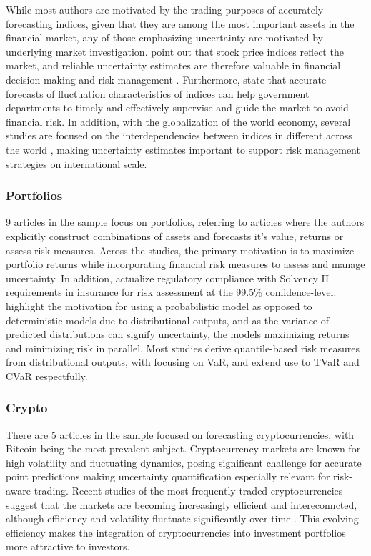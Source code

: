 While most authors are motivated by the trading purposes of accurately forecasting indices, given that they are among the most important assets in the financial market, any of those emphasizing uncertainty are motivated by underlying market investigation. \cite{Suphawan2022gpr} point out that stock price indices reflect the market, and reliable uncertainty estimates are therefore valuable in financial decision-making and risk management \parencite{Wang2021gpr}. Furthermore, \cite{Wang2021gprensemble} state that accurate forecasts of fluctuation characteristics of indices can help government departments to timely and effectively supervise and guide the market to avoid financial risk. In addition, with the globalization of the world economy, several studies are focused on the interdependencies between indices in different across the world \parencite{cao2019multi} \parencite{Malagrino2018Forecasting}, making uncertainty estimates important to support risk management strategies on international scale.

\subsubsection{Portfolios}
9 articles in the sample focus on portfolios, referring to articles where the authors explicitly construct combinations of assets and forecasts it's value, returns or assess risk measures. Across the studies, the primary motivation is to maximize portfolio returns while incorporating financial risk measures to assess and manage uncertainty. In addition, \cite{Risk2018gpr} actualize regulatory compliance with Solvency II requirements in insurance for risk assessment at the 99.5\% confidence-level. \cite{kim2023portfolio} highlight the motivation for using a probabilistic model as opposed to deterministic models due to distributional outputs, and as the variance of predicted distributions can signify uncertainty, the models maximizing returns and minimizing risk in parallel. Most studies derive quantile-based risk measures from distributional outputs, with \cite{Fatouros2023DeepVaR, arian2022encoded, caprioli2023quantifying} focusing on VaR, and  \cite{Risk2018gpr, Min2023BlackLitterman} extend use to TVaR and CVaR respectfully. 

\subsubsection{Crypto}
There are 5 articles in the sample focused on forecasting cryptocurrencies, with Bitcoin being the most prevalent subject. Cryptocurrency markets are known for high volatility and fluctuating dynamics, posing significant challenge for accurate point predictions making uncertainty quantification especially relevant for risk-aware trading. Recent studies of the most frequently traded cryptocurrencies suggest that the markets are becoming increasingly efficient and intereconncted, although efficiency and volatility fluctuate significantly over time \parencite{noda2021evolution, liu2019volatility, gupta2022empirical}. This evolving efficiency makes the integration of cryptocurrencies into investment portfolios more attractive to investors.

